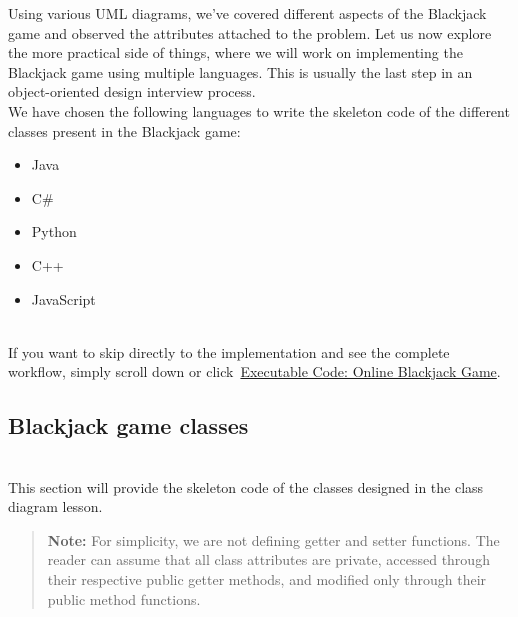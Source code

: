 

Using various UML diagrams, we've covered different aspects of the Blackjack game and observed the attributes attached to the problem. Let us now explore the more practical side of things, where we will work on implementing the Blackjack game using multiple languages. This is usually the last step in an object-oriented design interview process.
\\
We have chosen the following languages to write the skeleton code of the different classes present in the Blackjack game:

\begin{itemize}
\item
\protect{}\label{jr_IYwlFb5nLMm9d5MNWO}
Java
\item
\protect{}\label{UWn1ZTPLFyB05xlluPOuH}
C\#
\item
\protect{}\label{FPsF7TqNPs4EKX206N2cj}
Python
\item
\protect{}\label{hR0MUOnnytnUYXhePr1TF}
C++
\item
\protect{}\label{qbFFkvlc-M8q-Kd8U1Rdb}
JavaScript
\end{itemize}
\\
If you want to skip directly to the implementation and see the complete workflow, simply scroll down or click~\hyperref[Executable-Code-Online-Blackjack-Game]{Executable Code: Online Blackjack Game}.

\subsection{Blackjack game classes}\label{c1sKl9D6pmmSnzINYEn7T}
\\
This section will provide the skeleton code of the classes designed in the class diagram lesson.
\begin{quote}
\textbf{Note:} For simplicity, we are not defining getter and setter functions. The reader can assume that all class attributes are private, accessed through their respective public getter methods, and modified only through their public method functions.
\end{quote}
